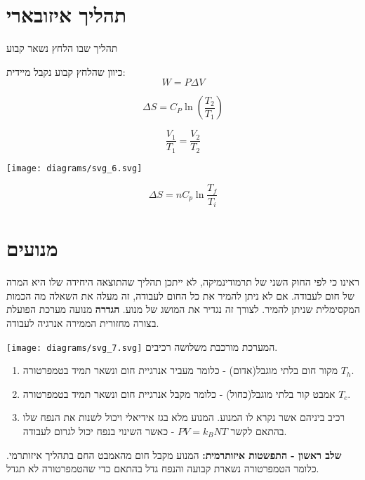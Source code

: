 \documentclass{tstextbook}
\begin{document}
\section{תהליך איזובארי}

\begin{definition}
תהליך שבו הלחץ נשאר קבוע

\end{definition}
\begin{proposition}
כיוון שהלחץ קבוע נקבל מיידית:
$$W=P\Delta V$$

\end{proposition}
\begin{proposition}
$$\Delta S =C_{P}\ln \left( \frac{T_{2}}{T_{1}} \right)$$

\end{proposition}
\begin{proposition}
$$\frac{V_{1}}{T_{1}}=\frac{V_{2}}{T_{2}}$$

\end{proposition}
\texttt{[image: diagrams/svg\_6.svg]}
\begin{proposition}
$$\Delta S=n C_{p}\ln{\frac{T_{f}}{T_{i}}}$$

\end{proposition}
\section{מנועים}

ראינו כי לפי החוק השני של תרמודינמיקה, לא ייתכן תהליך שהתוצאה היחידה שלו היא המרה של חום לעבודה. אם לא ניתן להמיר את כל החום לעבודה, זה מעלה את השאלה מה הכמות המקסימלית שניתן להמיר. לצורך זה נגדיר את המושג של מנוע.
\textbf{הגדרה} מנועה
מערכת הפועלת בצורה מחזורית הממירה אנרגיה לעבודה.

\texttt{[image: diagrams/svg\_7.svg]}
המערכת מורכבת משלושה רכיבים.

\begin{enumerate}
  \item מקור חום בלתי מוגבל(אדום) - כלומר מעביר אנרגיית חום ונשאר תמיד בטמפרטורה \(T_{h}\). 


  \item אמבט קור בלתי מוגבל(כחול) - כלומר מקבל אנרגיית חום ונשאר תמיד בטמפרטורה \(T_{c}\). 


  \item רכיב ביניהם אשר נקרא לו המנוע. המנוע מלא בגז אידיאלי ויכול לשנות את הנפח שלו בהתאם לקשר \(PV=k_{B}NT\) - כאשר השינוי בנפח יכול לגרום לעבודה. 


\end{enumerate}
\textbf{שלב ראשון - התפשטות איזותרמית:} 
המנוע מקבל חום מהאמבט החם בתהליך איזותרמי. כלומר הטמפרטורה נשארת קבועה והנפח גדל בהתאם כדי שהטמפרטורה לא תגדל.
\end{document}
